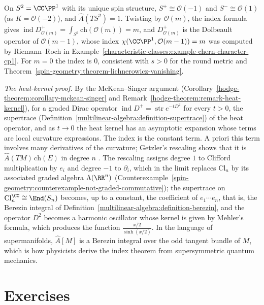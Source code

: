 \begin{example}\label{spin-geometry:example-sphere-index}
On $S^2 = \CC\PP^1$ with its unique spin structure, $S^+ \cong \mathcal{O}(-1)$ and $S^- \cong \mathcal{O}(1)$ (as $K = \mathcal{O}(-2)$), and $\hat{A}(TS^2) = 1$. Twisting by $\mathcal{O}(m)$, the index formula gives
$\operatorname{ind}D^+_{\mathcal{O}(m)} = \int_{S^2}\mathrm{ch}(\mathcal{O}(m)) = m$, and $D^+_{\mathcal{O}(m)}$ is the Dolbeault operator of $\mathcal{O}(m - 1)$, whose index $\chi(\CC\PP^1, \mathcal{O}(m - 1)) = m$ was computed by
Riemann--Roch in Example~\ref{characteristic-classes:example-chern-character-cp1}. For $m = 0$ the index is $0$, consistent with $s > 0$ for the round metric and Theorem~\ref{spin-geometry:theorem-lichnerowicz-vanishing}.
\end{example}

\begin{remark}\label{spin-geometry:remark-heat-kernel-proof}
\emph{The heat-kernel proof.} By the McKean--Singer argument (Corollary~\ref{hodge-theorem:corollary-mckean-singer} and Remark~\ref{hodge-theorem:remark-heat-kernel}), for a graded Dirac operator
$\operatorname{ind}D^+ = \operatorname{str}e^{-tD^2}$ for every $t > 0$, the supertrace (Definition~\ref{multilinear-algebra:definition-supertrace}) of the heat operator, and as $t \to 0$ the heat kernel has an asymptotic expansion
whose terms are local curvature expressions. The index is the constant term. A priori this term involves many derivatives of the curvature; Getzler's rescaling shows that it is $\hat{A}(TM)\,\mathrm{ch}(E)$ in degree $n$
\cite{berline-getzler-vergne}. The rescaling assigns degree $1$ to Clifford multiplication by $e_i$ and degree $-1$ to $\partial_i$, which in the limit replaces $\mathrm{Cl}_n$ by its associated graded algebra $\Lambda(\RR^n)$
(Counterexample~\ref{spin-geometry:counterexample-not-graded-commutative}); the supertrace on $\mathrm{Cl}^\CC_n \cong \End(S_n)$ becomes, up to a constant, the coefficient of $e_1\cdots e_n$, that is, the Berezin integral of
Definition~\ref{multilinear-algebra:definition-berezin}, and the operator $D^2$ becomes a harmonic oscillator whose kernel is given by Mehler's formula, which produces the function $\frac{x/2}{\sinh(x/2)}$. In the language of
supermanifolds, $\hat{A}[M]$ is a Berezin integral over the odd tangent bundle of $M$, which is how physicists derive the index theorem from supersymmetric quantum mechanics.
\end{remark}

\section{Exercises}\label{spin-geometry:section-exercises}

